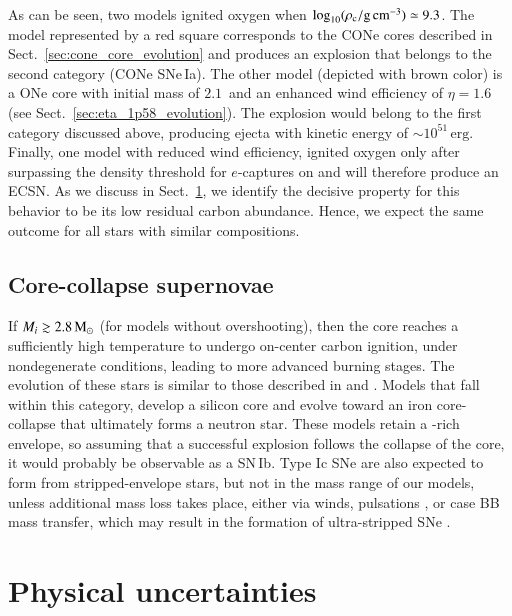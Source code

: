 \documentclass[main.tex]{subfiles}
\begin{document}
As can be seen, two models ignited oxygen when $\log_{10} (\rho_{\mathrm{c}}/ \mathrm{g\,cm^{-3}})\simeq 9.3$. The model represented by a red square corresponds to the CONe cores described in Sect.~\ref{sec:cone_core_evolution} and produces an explosion that belongs to the second category (CONe SNe\,Ia). The other model (depicted with brown color) is a \seriestwo ONe core with initial mass of $2.1$\msun\ and an enhanced wind efficiency of $\eta = 1.6$ (see Sect.~\ref{sec:eta_1p58_evolution}). The explosion would belong to the first category discussed above, producing ejecta with kinetic energy of $\sim  10^{51}\, \text{erg}$. 
Finally, one \seriestwo model with reduced wind efficiency, ignited oxygen only after surpassing the density threshold for 
$e$-captures on  and will therefore produce an ECSN. As we discuss in Sect.~\ref{sec:physical_uncertainties}, we identify the decisive property for this behavior to be its low residual carbon abundance. Hence, we expect the same outcome  for all stars with  similar compositions. 


\subsection{Core-collapse supernovae}\label{sec:ccsn_evolution}
If $ M_i  \gtrsim 2.8\mathrm{\,M_\odot}$ (for models without overshooting), then the core reaches a 
sufficiently high temperature to undergo on-center carbon ignition, under nondegenerate conditions, leading to more advanced burning stages. The evolution of these stars is similar to those described in \cite{Jones2013apj} and \cite{Woosley:2019sdf}.
Models that fall within this category, develop a silicon core and evolve toward an iron core-collapse that  ultimately forms a neutron 
star. These models retain a -rich envelope, so assuming that a successful explosion follows the collapse of the core, it would 
probably be observable  as a SN\,Ib. Type Ic SNe are also expected to 
form from stripped-envelope stars, but not in the mass range of our 
models, unless additional mass loss takes place, either via winds,  
pulsations \citep{Aguilera-Dena:2021abc}, or case BB mass transfer, 
which may result in the formation of ultra-stripped SNe  \citep{Tauris:2015xra}. 



\section{Physical uncertainties} \label{sec:physical_uncertainties}
\end{document}
